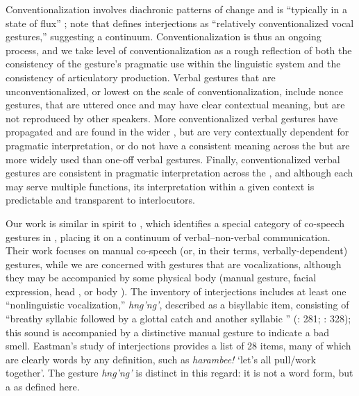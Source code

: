 \documentclass[output=paper,newtxmath,modfonts,nonflat,hidelinks]{langsci/langscibook}
\begin{document}
Conventionalization involves diachronic patterns of change and is ``typically in a state of flux'' \citep[27]{ferguson1994}; note that \citet[106]{ameka1992} defines interjections as ``relatively conventionalized vocal gestures,'' suggesting a continuum. Conventionalization is thus an ongoing process,  and we take level of conventionalization as a rough reflection of both the consistency of the gesture's pragmatic use within the linguistic system and the consistency of articulatory production. Verbal gestures that are unconventionalized, or lowest on the scale of conventionalization, include nonce gestures, that are uttered once and may have clear contextual meaning, but are not   reproduced by other speakers. More conventionalized verbal gestures have propagated and are found in the wider , but are very contextually dependent  for  pragmatic interpretation, or do not have a consistent meaning across the  but are more widely used than one-off verbal gestures. Finally, conventionalized verbal gestures are consistent in  pragmatic interpretation across the , and although each  may serve multiple functions, its interpretation within a given context is predictable and transparent to interlocutors.
  
Our work is similar in spirit to \citet{eastmanomar1985}, which identifies a special category of co-speech gestures in , placing it on a continuum of verbal--non-verbal communication.  Their work focuses on manual co-speech (or, in their terms, verbally-dependent) gestures, while we are concerned with gestures that are vocalizations, although they may be accompanied by some physical body  (manual gesture, facial expression, head , or body ). The inventory of  interjections includes at least one  ``nonlinguistic vocalization,'' \textit{hng'ng'}, described as a bisyllabic item, consisting of  ``breathy syllabic  followed by a glottal catch and another syllabic '' (\citealt{eastman1992}: 281; \citealt{eastmanomar1985}: 328); this sound is accompanied by a distinctive manual gesture to indicate a bad smell. Eastman's study of  interjections provides a list of 28 items, many of which are clearly words by any definition, such as \textit{harambee!} `let's all pull/work together'. The gesture \textit{hng'ng'} is distinct in this regard: it is not a word form, but a  as defined here.
\end{document}
